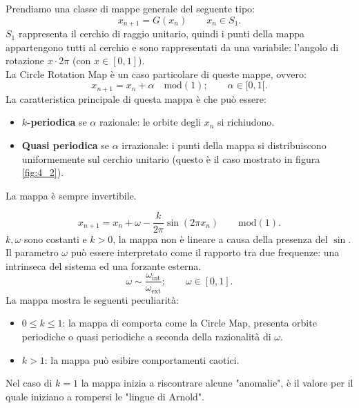     \begin{exmp}
	Prendiamo una classe di mappe generale del seguente tipo:
        \[
	    x_{n+1} = G(x_n) \qquad x_n \in S_1
        .\] 
	$S_1$ rappresenta il cerchio di raggio unitario, quindi i punti della mappa appartengono tutti al cerchio e sono rappresentati da una variabile: l'angolo di rotazione $x\cdot 2\pi$ (con $x \in \left[0,1\right]$).
	\\
	La Circle Rotation Map è un caso particolare di queste mappe, ovvero:
	\[
	    x_{n+1}=x_n+\alpha  \quad \text{mod}(1); \qquad \alpha\in [0,1[
	.\] 
	La caratteristica principale di questa mappa è che può essere:
	\begin{itemize}
	    \item \textbf{$k$-periodica} se $\alpha$ razionale: le orbite degli $x_n$ si richiudono.
	    \item \textbf{Quasi periodica} se $\alpha$ irrazionale: i punti della mappa si distribuiscono uniformemente sul cerchio unitario (questo è il caso mostrato in figura \ref{fig:4_2}).
	\end{itemize}
	La mappa è sempre invertibile. 
\end{exmp}
\noindent
\begin{exmp}
        \[
	    x_{n+1} = x_n + \omega  - \frac{k}{2\pi}\sin (2\pi x_n) \qquad \text{mod}(1) 
        .\] 
	$k, \omega$ sono costanti e $k>0$, la mappa non è lineare a causa della presenza del $\sin$.\\
	Il parametro $\omega$ può essere interpretato come il rapporto tra due frequenze: una intrinseca del sistema ed una forzante esterna.
	\[
	    \omega  \sim \frac{\omega_{\text{int}}}{\omega_{\text{ext}}}; \qquad \omega \in \left[0,1\right]
	.\]
	La mappa mostra le seguenti peculiarità:
	\begin{itemize}
	    \item $0\le k\le 1$: la mappa di comporta come la Circle Map, presenta orbite periodiche o quasi periodiche a seconda della razionalità di $\omega$. 
	    \item $k>1$: la mappa può esibire comportamenti caotici.
	\end{itemize}
	Nel caso di $k=1$ la mappa inizia a riscontrare alcune "anomalie", è il valore per il quale iniziano a rompersi le "lingue di Arnold".
\end{exmp}
\noindent

